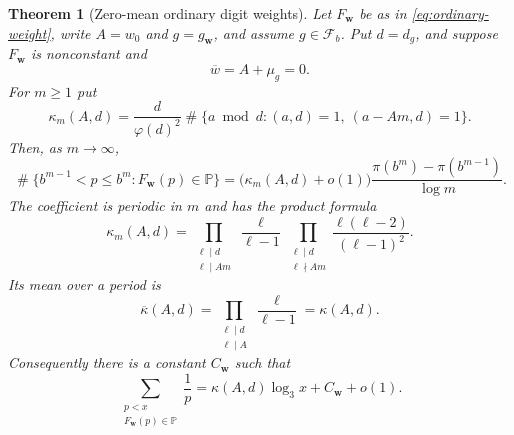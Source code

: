 \documentclass[11pt,reqno]{amsart}
\theoremstyle{plain}
\newtheorem{theorem}{Theorem}[section]
\theoremstyle{definition}
\newcommand{\Pp}{\mathbb{P}}
\newcommand{\1}{\mathbf 1}
\DeclareMathOperator{\Card}{\#}
\begin{document}
\begin{theorem}[Zero-mean ordinary digit weights]\label{thm:digitweights-zero}
Let $F_{\mathbf w}$ be as in \eqref{eq:ordinary-weight}, write $A=w_0$ and $g=g_{\mathbf w}$, and assume $g\in\mathcal F_b$.  Put $d=d_g$, and suppose $F_{\mathbf w}$ is nonconstant and
\[
 \overline w=A+\mu_g=0.
\]
For $m\ge1$ put
\begin{equation}\label{eq:kappa-m}
 \kappa_m(A,d)=\frac d{\varphi(d)^2}
 \Card\{a\bmod d:(a,d)=1,\ (a-Am,d)=1\}.
\end{equation}
Then, as $m\to\infty$,
\begin{equation}\label{eq:zero-weight-shell}
 \Card\{b^{m-1}<p\le b^m:F_{\mathbf w}(p)\in\Pp\}
 =\big(\kappa_m(A,d)+o(1)\big)
 \frac{\pi(b^m)-\pi(b^{m-1})}{\log m}.
\end{equation}
The coefficient is periodic in $m$ and has the product formula
\begin{equation}\label{eq:kappa-m-product}
 \kappa_m(A,d)=
 \prod_{\substack{\ell\mid d\\\ell\mid Am}}\frac\ell{\ell-1}
 \prod_{\substack{\ell\mid d\\\ell\nmid Am}}
 \frac{\ell(\ell-2)}{(\ell-1)^2}.
\end{equation}
Its mean over a period is
\begin{equation}\label{eq:kappa-average}
 \overline\kappa(A,d)=
 \prod_{\substack{\ell\mid d\\\ell\mid A}}\frac\ell{\ell-1}
 =\kappa(A,d).
\end{equation}
Consequently there is a constant $C_{\mathbf w}$ such that
\begin{equation}\label{eq:zero-weight-mertens}
 \sum_{\substack{p<x\\F_{\mathbf w}(p)\in\Pp}}\frac1p
 =\kappa(A,d)\log_3x+C_{\mathbf w}+o(1).
\end{equation}
\end{theorem}
\end{document}
